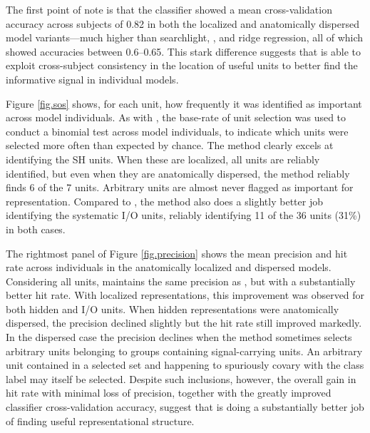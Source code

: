 The first point of note is that the {\soslasso} classifier showed a mean cross-validation accuracy across subjects of 0.82 in both the localized and anatomically dispersed model variants---much higher than searchlight, {\lasso}, and ridge regression, all of which showed accuracies between 0.6--0.65. This stark difference suggests that {\soslasso} is able to exploit cross-subject consistency in the location of useful units to better find the informative signal in individual models.

Figure \ref{fig.sos} shows, for each unit, how frequently it was identified as important across model individuals. As with {\lasso}, the base-rate of unit selection was used to conduct a binomial test across model individuals, to indicate which units were selected more often than expected by chance. The method clearly excels at identifying the SH units. When these are localized, all units are reliably identified, but even when they are anatomically dispersed, the method reliably finds 6 of the 7 units. Arbitrary units are almost never flagged as important for representation. Compared to {\lasso}, the method also does a slightly better job identifying the systematic I/O units, reliably identifying 11 of the 36 units (31\%) in both cases.

The rightmost panel of Figure \ref{fig.precision} shows the mean precision and hit rate across individuals in the anatomically localized and dispersed models. Considering all units, {\soslasso} maintains the same precision as {\lasso}, but with a substantially better hit rate. With localized representations, this improvement was observed for both hidden and I/O units. When hidden representations were anatomically dispersed, the precision declined slightly but the hit rate still improved markedly. In the dispersed case the precision declines when the method sometimes selects arbitrary units belonging to groups containing signal-carrying units. An arbitrary unit contained in a selected set and happening to spuriously covary with the class label may itself be selected. Despite such inclusions, however, the overall gain in hit rate with minimal loss of precision, together with the greatly improved classifier cross-validation accuracy, suggest that {\soslasso} is doing a substantially better job of finding useful representational structure.

